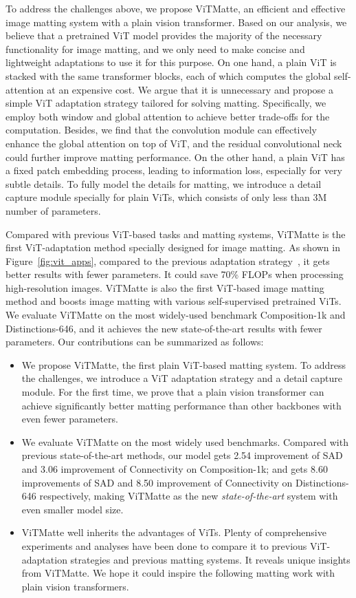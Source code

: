 \documentclass[10pt,twocolumn,letterpaper]{article}
\newcommand{\thename}{ViTMatte}
\begin{document}
To address the challenges above, we propose \thename, an efficient and effective image matting system with a plain vision transformer. Based on our analysis, we believe that a pretrained ViT model provides the majority of the necessary functionality for image matting, and we only need to make concise and lightweight adaptations to use it for this purpose. On one hand, a plain ViT is stacked with the same transformer blocks, each of which computes the global self-attention at an expensive cost. We argue that it is unnecessary and propose a simple ViT adaptation strategy tailored for solving matting. Specifically, we employ both window and global attention to achieve better trade-offs for the computation. Besides, we find that the convolution module can effectively enhance the global attention on top of ViT, and the residual convolutional neck could further improve matting performance. On the other hand, a plain ViT has a fixed patch embedding process, leading to information loss, especially for very subtle details. To fully model the details for matting, we introduce a detail capture module specially for plain ViTs, which consists of only less than 3M number of parameters.

Compared with previous ViT-based tasks and matting systems, \thename{} is the first ViT-adaptation method specially designed for image matting. As shown in Figure~\ref{fig:vit_apps}, compared to the previous adaptation strategy~\cite{vitdet}, it gets better results with fewer parameters. It could save 70\% FLOPs when processing high-resolution images. \thename{} is also the first ViT-based image matting method and boosts image matting with various self-supervised pretrained ViTs. We evaluate \thename{} on the most widely-used benchmark Composition-1k and Distinctions-646, and it achieves the new state-of-the-art results with fewer parameters. Our contributions can be summarized as follows:

\begin{itemize}
    \item We propose \thename{}, the first plain ViT-based matting system. To address the challenges, we introduce a ViT adaptation strategy and a detail capture module. For the first time, we prove that a plain vision transformer can achieve significantly better matting performance than other backbones with even fewer parameters.
    \item We evaluate \thename{} on the most widely used benchmarks. Compared with previous state-of-the-art methods, our model gets 2.54 improvement of SAD and 3.06 improvement of Connectivity on Composition-1k; and gets 8.60 improvements of SAD and 8.50 improvement of Connectivity on Distinctions-646 respectively, making \thename{} as the new \emph{state-of-the-art} system with even smaller model size.
    \item \thename{} well inherits the advantages of ViTs. Plenty of comprehensive experiments and analyses have been done to compare it to previous ViT-adaptation strategies and previous matting systems. It reveals unique insights from ViTMatte. We hope it could inspire the following matting work with plain vision transformers.
\end{itemize}
\end{document}
